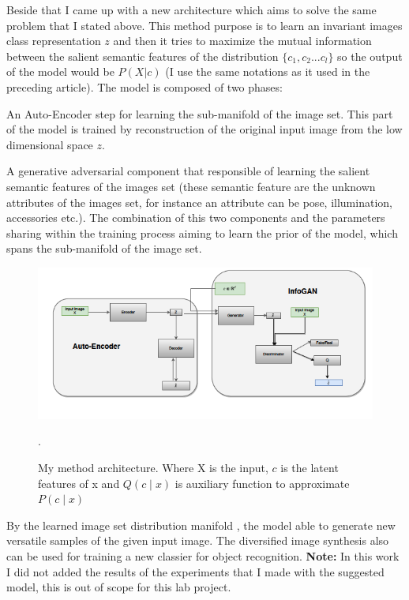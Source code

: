 \documentclass[letterpaper,12pt]{article}
\begin{document}
Beside that I came up with a new architecture which aims to solve the same problem that I stated above. This method purpose is to learn an invariant images class representation \(z\) and then it tries to maximize the mutual information between the salient semantic features of the distribution \(\{c_1,c_2...c_l\}\) so the output of the model would be \(P(X|c)\) (I use the same notations as it used in the preceding article\cite{NIPS2016_6399}). The  model is composed of two phases:\newline
\begin{enumerate*}[label={\roman*)},font={\color{red!50!black}\bfseries}]
\item An Auto-Encoder step for learning the sub-manifold of the image set. This part of the model is trained by reconstruction of the original input image from the low dimensional space \(z\).

\item A generative adversarial component that responsible of learning the salient semantic features of the images set (these semantic feature are the unknown attributes of the images set, for instance an attribute can be pose, illumination, accessories etc.). The combination of this two components and the parameters sharing within the training process aiming to learn the prior of the model, which spans the sub-manifold of the image set.
\end{enumerate*}
 \begin{figure}[H]
\centering
\includegraphics[scale=0.8]{faderInfoGan}
\caption{\label{figure 1 }My method architecture. Where X is the input, $c$ is the latent features of x  and  \( Q(c\mid x) \) is auxiliary function to approximate \(P(c\mid x)\)}.
\end{figure}

By the learned image set distribution manifold , the model able to generate new versatile samples of the given input image. 
The diversified image synthesis also can be used for training a new classier for object recognition.
\newline\newline\textbf{Note:} In this work I did not added the results of the experiments that I made with the suggested model, this is out of scope for this lab project.
\end{document}
